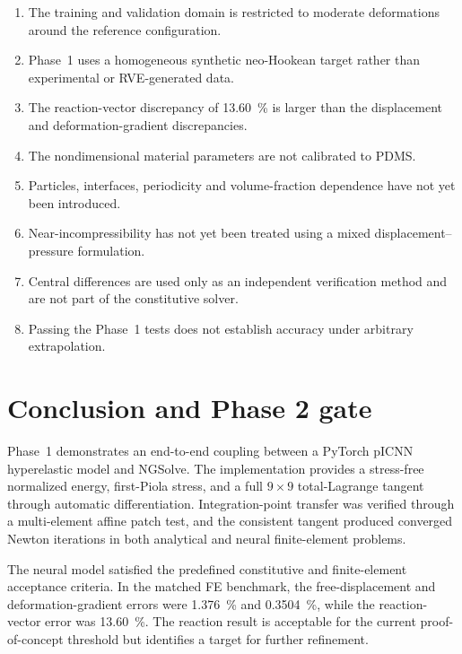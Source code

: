 \documentclass[11pt,a4paper]{article}
\begin{document}
\begin{enumerate}[label=\arabic*.]
  \item The training and validation domain is restricted to moderate
        deformations around the reference configuration.
  \item Phase~1 uses a homogeneous synthetic neo-Hookean target rather than
        experimental or RVE-generated data.
  \item The reaction-vector discrepancy of \SI{13.60}{\percent} is larger than
        the displacement and deformation-gradient discrepancies.
  \item The nondimensional material parameters are not calibrated to PDMS.
  \item Particles, interfaces, periodicity and volume-fraction dependence have
        not yet been introduced.
  \item Near-incompressibility has not yet been treated using a mixed
        displacement--pressure formulation.
  \item Central differences are used only as an independent verification
        method and are not part of the constitutive solver.
  \item Passing the Phase~1 tests does not establish accuracy under arbitrary
        extrapolation.
\end{enumerate}

\section{Conclusion and Phase 2 gate}

Phase~1 demonstrates an end-to-end coupling between a PyTorch pICNN
hyperelastic model and NGSolve. The implementation provides a stress-free
normalized energy, first-Piola stress, and a full $9\times9$ total-Lagrange
tangent through automatic differentiation. Integration-point transfer was
verified through a multi-element affine patch test, and the consistent
tangent produced converged Newton iterations in both analytical and neural
finite-element problems.

The neural model satisfied the predefined constitutive and finite-element
acceptance criteria. In the matched FE benchmark, the free-displacement and
deformation-gradient errors were \SI{1.376}{\percent} and
\SI{0.3504}{\percent}, while the reaction-vector error was
\SI{13.60}{\percent}. The reaction result is acceptable for the current
proof-of-concept threshold but identifies a target for further refinement.
\end{document}
